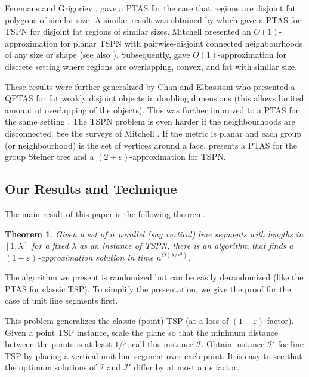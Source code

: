 \documentclass[10pt,a4paper]{amsart}
\theoremstyle{thmstyleone}
\newtheorem{theorem}{Theorem}
\newcommand{\eps}{\varepsilon}
\newcommand{\calI}{{\mathcal I}}
\begin{document}
Feremans and Grigoriev \cite{FG05}, gave a PTAS for the case that regions are disjoint fat polygons of similar size.
A similar result was obtained by \cite{BodlaenderFGPSW09} which gave a PTAS for TSPN for disjoint fat regions of similar sizes.
Mitchell \cite{Mitchell10} presented an $O(1)$-approximation for planar TSPN with pairwise-disjoint connected neighbourhoods of any size or shape (see also \cite{Berg05}). Subsequently, \cite{EFMS05} gave $O(1)$-approximation
for discrete setting where regions are overlapping, convex, and fat with similar size.

These results were further generalized by Chan and Elbassioni \cite{ChanE11} who presented a QPTAS for fat weakly disjoint objects in doubling dimensions (this allows limited amount of overlapping of the objects). This was further improved to a PTAS for the same setting \cite{ChanHJ16}. 
The TSPN problem is even harder if the neighbourhoods are disconnected. See the surveys of Mitchell \cite{Mitchell00,Mitchell04}. 
If the metric is planar and each group (or neighbourhood) is the set of vertices around a face, \cite{Bateni16} presents a PTAS for the group Steiner tree and a $(2+\eps)$-approximation for TSPN.


\subsection{Our Results and Technique}
The main result of this paper is the following theorem.

\begin{theorem}\label{thm:main}
    Given a set of $n$ parallel (say vertical)
    line segments with lengths in $[1,\lambda]$ for a fixed $\lambda$
    as an instance of TSPN, there is an algorithm that finds a $(1+\eps)$-approximation solution in time $n^{O(\lambda/\eps^3)}$.
\end{theorem}



The algorithm we present is randomized but can be easily derandomized (like the PTAS for classic TSP).
To simplify the presentation, we give the proof for the case of unit line segments first.


This problem generalizes the classic (point) TSP (at a loss of $(1+\eps)$ factor). Given a point TSP instance, scale the plane so that 
the minimum distance between the points is at least $1/\eps$; call this instance $\calI$. Obtain instance $\calI'$ for line TSP by placing a vertical unit line segment over each point. It is easy to see that the optimum solutions of $\calI$ and $\calI'$ differ by at most an $\epsilon$ factor.
\end{document}
